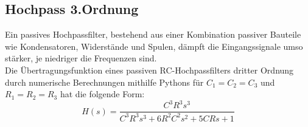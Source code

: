 \subsection{Hochpass 3.Ordnung}
\label{subsec:Hochpass_3}
Ein passives Hochpassfilter, bestehend aus einer Kombination passiver Bauteile wie Kondensatoren, Widerstände und Spulen, dämpft die Eingangssignale umso stärker, je niedriger die Frequenzen sind.\\
%
Die Übertragungsfunktion eines passiven RC-Hochpassfilters dritter Ordnung durch numerische Berechnungen mithilfe Pythons für $C_1=C_2=C_3$ und $R_1=R_2=R_3$ hat die folgende Form:
\begin{equation}
H(s)= \frac{C^3R^3s^3}{C^3R^3s^3 +  6R^2 C^2 s^2+ 5CRs + 1} 
\end{equation}







